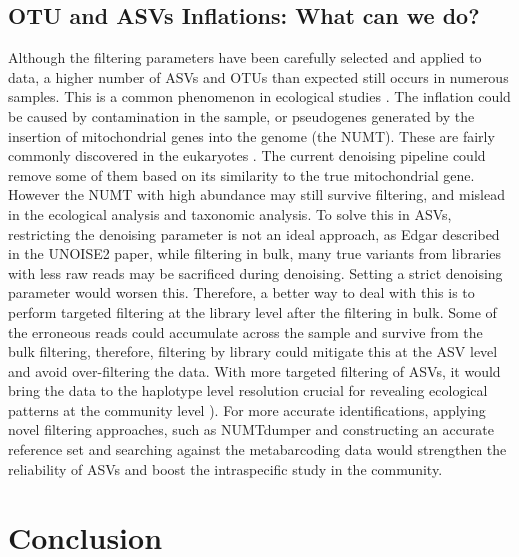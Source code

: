 \documentclass[11pt, a4paper]{article}
\begin{document}
\subsection{OTU and ASVs Inflations: What can we do?}
Although the filtering parameters have been carefully selected and applied to data, a higher number of ASVs and OTUs than expected still occurs in numerous samples. This is a common phenomenon in ecological studies\cite{Flynn2015} . The inflation could be caused by contamination in the sample, or pseudogenes generated by the insertion of mitochondrial genes into the genome (the NUMT). These are fairly commonly discovered in the eukaryotes \cite{Bensasson2001}. The current denoising pipeline could remove some of them based on its similarity to the true mitochondrial gene. However the NUMT with high abundance may still survive filtering, and mislead in the ecological analysis and taxonomic analysis\cite{Tsuji2012}. To solve this in ASVs, restricting the denoising parameter is not an ideal approach, as Edgar described in the UNOISE2 paper\cite{Edgar2016b}, while filtering in bulk, many true variants from libraries with less raw reads may be sacrificed during denoising. Setting a strict denoising parameter would worsen this. Therefore, a better way to deal with this is to perform targeted filtering at the library level after the filtering in bulk. Some of the erroneous reads could accumulate across the sample and survive from the bulk filtering, therefore, filtering by library could mitigate this at the ASV level and avoid over-filtering the data. With more targeted filtering of ASVs, it would bring the data to the haplotype level resolution crucial for revealing ecological patterns at the community level \cite{Callahan2017}). For more accurate identifications, applying novel filtering approaches, such as NUMTdumper\cite{Andujar2020} and constructing an accurate reference set and searching against the metabarcoding data would strengthen the reliability of ASVs and boost the intraspecific study in the community.

\section{Conclusion}
\end{document}
